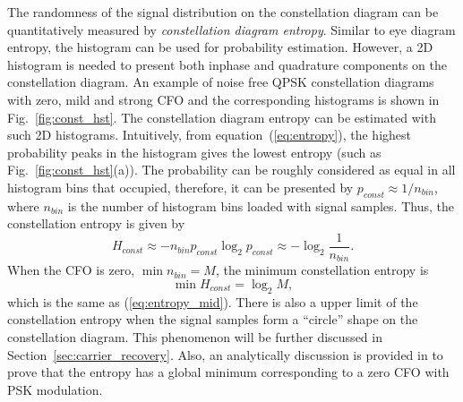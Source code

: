 \documentclass[journal,comsoc, onecolumn, 12pt,draftclsnofoot]{IEEEtran} %
\begin{document}
The randomness of the signal distribution on the constellation diagram can be quantitatively measured by \textit{constellation diagram entropy}.
Similar to eye diagram entropy, the histogram can be used for probability estimation.
However, a 2D histogram is needed to present both inphase and quadrature components on the constellation diagram.
An example of noise free QPSK constellation diagrams with zero, mild and strong CFO and the corresponding histograms is shown in Fig.~\ref{fig:const_hst}.
The constellation diagram entropy can be estimated with such 2D histograms.
Intuitively, from equation~(\ref{eq:entropy}), the highest probability peaks in the histogram gives the lowest entropy (such as Fig.~\ref{fig:const_hst}(a)).
The probability can be roughly considered as equal in all histogram bins that occupied, 
therefore, it can be presented by \(p_{const} \approx {1}/{n_{bin}}\), where \(n_{bin}\) is the number of histogram bins loaded with signal samples.
Thus, the constellation entropy is given by
\begin{equation}
H_{const} \approx - n_{bin} p_{const} \log_2 {p_{const}} \approx -\log_2 {\frac{1}{n_{bin}}}.
\label{eq:const_ent}
\end{equation}
When the CFO is zero, \(\min{n_{bin}}=M\),  the minimum constellation entropy is
\begin{equation}
\min{H_{const}=\log_2 {M}},
\end{equation}
which is the same as (\ref{eq:entropy_mid}).
There is also a upper limit of the constellation entropy when the signal samples form a ``circle'' shape on the constellation diagram.
% 
% 
This phenomenon will be further discussed in Section~\ref{sec:carrier_recovery}.
Also, an analytically discussion is provided in \cite{Pedzisz2006} to prove that the entropy has a global minimum corresponding to a zero CFO with PSK modulation.
\end{document}
